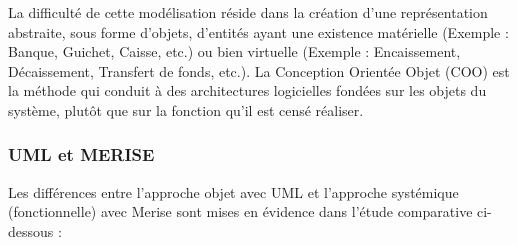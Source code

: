 La difficulté de cette modélisation réside dans la création d’une représentation abstraite, sous
forme d’objets, d’entités ayant une existence matérielle (Exemple : Banque, Guichet, Caisse, etc.) ou bien virtuelle (Exemple : Encaissement, Décaissement, Transfert de fonds, etc.).
La Conception Orientée Objet (COO) est la méthode qui conduit à des architectures logicielles
fondées sur les objets du système, plutôt que sur la fonction qu’il est censé réaliser.

\subsubsection{UML et MERISE}

Les différences entre l’approche objet avec UML et l’approche systémique (fonctionnelle)
avec Merise sont mises en évidence dans l’étude comparative ci- dessous :

